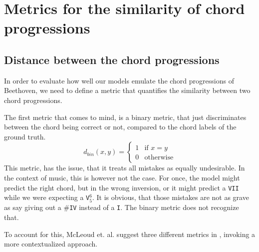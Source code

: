\section{Metrics for the similarity of chord progressions}

\subsection{Distance between the chord progressions}
In order to evaluate how well our models emulate the chord progressions of Beethoven, we need to define a metric that quantifies the similarity between two chord progressions.

The first metric that comes to mind, is a binary metric, that just discriminates between the chord being correct or not, compared to the chord labels of the ground truth.
\[
     d_{bin}(x, y) = \begin{cases}
        1 & \text{if } x = y \\
        0 & \text{otherwise}
    \end{cases}
\]
This metric, has the issue, that it treats all mistakes as equally undesirable. In the context of music, this is however not the case. 
For once, the model might predict the right chord, but in the wrong inversion, or it might predict a \texttt{VII} while we were expecting a \texttt{V}$^{6}_5$. It is obvious, that those mistakes are not as grave as say giving out a \#\texttt{IV} instead of a \texttt{I}. The binary metric does not recognize that.

To account for this, McLeoud et. al.  suggest three different metrics in \cite{McLeod2022}, invoking a more contextualized approach.

